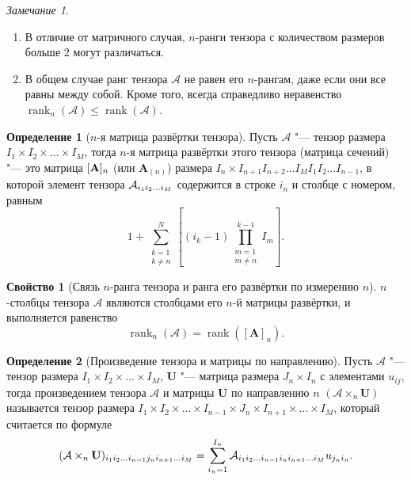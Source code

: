 \documentclass[specialist,
  substylefile=spbu_report.rtx,
subf,href,colorlinks=true, 12pt]{disser}
\theoremstyle{plain}
\theoremstyle{definition}
\newtheorem{definition}{Определение}[section]
\newtheorem{property}{Свойство}[section]
\theoremstyle{remark}
\newtheorem*{remark}{Замечание}
\begin{document}
\begin{remark}
  \begin{enumerate}
    \item В отличие от матричного случая, $n$-ранги тензора с количеством размеров больше $2$ могут различаться.
    \item В общем случае ранг тензора $\mathcal{A}$ не равен его $n$-рангам, даже если они все равны между
      собой.
      Кроме того, всегда справедливо неравенство
      $\operatorname{rank}_n(\mathcal{A})\leqslant \operatorname{rank}(\mathcal{A})$.
  \end{enumerate}
\end{remark}

\begin{definition}[$n$-я матрица развёртки тензора]
  Пусть $\mathcal{A}$ "--- тензор размера \linebreak $I_1\times I_2\times\ldots\times I_M$, тогда $n$-я матрица
  развёртки этого тензора (матрица сечений) "--- это матрица $[\mathbf{A}]_n$ (или $\mathbf{A}_{(n)}$)
  размера $I_n\times I_{n+1}I_{n+2}\ldots I_{M}I_{1}I_{2}\ldots I_{n-1}$,
  в которой элемент тензора $\mathcal{A}_{i_1 i_2\ldots i_M}$ содержится в строке $i_n$ и столбце с номером, равным
  \[
    1 + \sum_{\substack{k = 1 \\ k \ne n}}^{N} \left[(i_k - 1)
    \prod_{\substack{m=1 \\ m\ne n}}^{k-1} I_m\right].
  \]
\end{definition}

\begin{property}
  [Связь $n$-ранга тензора и ранга его развёртки по измерению $n$]
  $n$-столб\-цы тензора $\mathcal{A}$ являются столбцами его $n$-й матрицы развёртки, и выполняется равенство
  \[
    \operatorname{rank}_{n}(\mathcal{A})=\operatorname{rank}\left(\left[\mathbf{A}\right]_n\right).
  \]
\end{property}

\begin{definition}[Произведение тензора и матрицы по направлению]
  Пусть $\mathcal A$ "--- тензор размера $I_1\times I_2\times\ldots\times I_M$, $\mathbf U$
  "--- матрица размера $J_n\times I_n$ с элементами $u_{ij}$,
  тогда произведением тензора $\mathcal{A}$ и матрицы $\mathbf{U}$ по
  направлению $n$ $(\mathcal{A}\times_n \mathbf U)$ называется тензор размера
  $I_1\times I_2\times\ldots\times I_{n-1} \times J_n\times I_{n+1}\times \ldots\times I_M$,
  который считается по формуле
  \[
    (\mathcal{A}\times_n \mathbf U)_{i_1 i_2\ldots i_{n-1}j_n i_{n+1}\ldots i_M} =
    \sum_{i_n=1}^{I_n} \mathcal{A}_{i_1 i_2\ldots i_{n-1}i_n i_{n+1} \ldots i_M} u_{j_n i_n}.
  \]
\end{definition}
\end{document}
